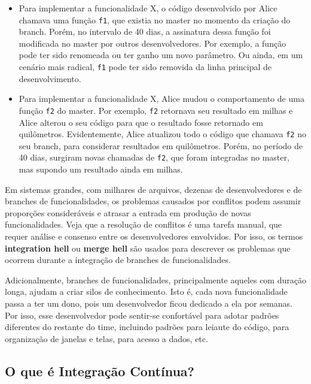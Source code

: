 \documentclass[
  11pt,
  twoside]{book}
\newcommand{\passthrough}[1]{#1}
\begin{document}
\begin{itemize}
\item
  Para implementar a funcionalidade X, o código desenvolvido por Alice
  chamava uma função \passthrough{\lstinline!f1!}, que existia no master
  no momento da criação do branch. Porém, no intervalo de 40 dias, a
  assinatura dessa função foi modificada no master por outros
  desenvolvedores. Por exemplo, a função pode ter sido renomeada ou ter
  ganho um novo parâmetro. Ou ainda, em um cenário mais radical,
  \passthrough{\lstinline!f1!} pode ter sido removida da linha principal
  de desenvolvimento.
\item
  Para implementar a funcionalidade X, Alice mudou o comportamento de
  uma função \passthrough{\lstinline!f2!} do master. Por exemplo,
  \passthrough{\lstinline!f2!} retornava seu resultado em milhas e Alice
  alterou o seu código para que o resultado fosse retornado em
  quilômetros. Evidentemente, Alice atualizou todo o código que chamava
  \passthrough{\lstinline!f2!} no seu branch, para considerar resultados
  em quilômetros. Porém, no período de 40 dias, surgiram novas chamadas
  de \passthrough{\lstinline!f2!}, que foram integradas no master, mas
  supondo um resultado ainda em milhas.
\end{itemize}

  Em sistemas grandes, com
milhares de arquivos, dezenas de desenvolvedores e de branches de
funcionalidades, os problemas causados por conflitos podem assumir
proporções consideráveis e atrasar a entrada em produção de novas
funcionalidades. Veja que a resolução de conflitos é uma tarefa manual,
que requer análise e consenso entre os desenvolvedores envolvidos. Por
isso, os termos \textbf{integration hell} ou \textbf{merge hell} são
usados para descrever os problemas que ocorrem durante a integração de
branches de funcionalidades.

Adicionalmente, branches de funcionalidades, principalmente aqueles com
duração longa, ajudam a criar silos de conhecimento. Isto é, cada nova
funcionalidade passa a ter um dono, pois um desenvolvedor ficou dedicado
a ela por semanas. Por isso, esse desenvolvedor pode sentir-se
confortável para adotar padrões diferentes do restante do time,
incluindo padrões para leiaute do código, para organização de janelas e
telas, para acesso a dados, etc.

\hypertarget{o-que-uxe9-integrauxe7uxe3o-contuxednua}{%
\subsection{O que é Integração
Contínua?}\label{o-que-uxe9-integrauxe7uxe3o-contuxednua}}
\end{document}
